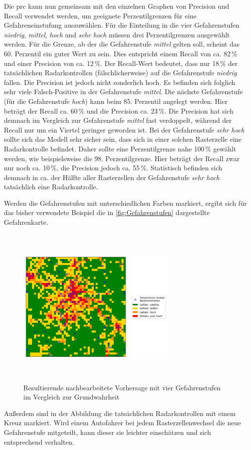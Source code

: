 Die \acrshort{prc} kann nun gemeinsam mit den einzelnen Graphen von Precision und Recall verwendet werden, um geeignete Perzentilgrenzen für eine Gefahreneinstufung auszuwählen.
Für die Einteilung in die vier Gefahrenstufen \emph{niedrig}, \emph{mittel}, \emph{hoch} und \emph{sehr hoch} müssen drei Perzentilgrenzen ausgewählt werden.
Für die Grenze, ab der die Gefahrenstufe \emph{mittel} gelten soll, scheint das 60. Perzentil ein guter Wert zu sein.
Dies entspricht einem Recall von ca. 82\,\% und einer Precision von ca. 12\,\%.
Der Recall-Wert bedeutet, dass nur 18\,\% der tatsächlichen Radarkontrollen (fälschlicherweise) auf die Gefahrenstufe \emph{niedrig} fallen.
Die Precision ist jedoch nicht sonderlich hoch.
Es befinden sich folglich sehr viele Falsch-Positive in der Gefahrenstufe \emph{mittel}.
Die nächste Gefahrenstufe (für die Gefahrenstufe \emph{hoch}) kann beim 85. Perzentil angelegt werden.
Hier beträgt der Recall ca. 60\,\% und die Precision ca. 23\,\%.
Die Precision hat sich demnach im Vergleich zur Gefahrenstufe \emph{mittel} fast verdoppelt, während der Recall nur um ein Viertel geringer geworden ist.
Bei der Gefahrenstufe \emph{sehr hoch} sollte sich das Modell sehr sicher sein, dass sich in einer solchen Rasterzelle eine Radarkontrolle befindet.
Daher sollte eine Perzentilgrenze nahe 100\,\% gewählt werden, wie beispielsweise die 98. Perzentilgrenze.
Hier beträgt der Recall zwar nur noch ca. 10\,\%, die Precision jedoch ca. 55\,\%.
Statistisch befinden sich demnach in ca. der Hälfte aller Rasterzellen der Gefahrenstufe \emph{sehr hoch} tatsächlich eine Radarkontrolle.

Werden die Gefahrenstufen mit unterschiedlichen Farben markiert, ergibt sich für das bisher verwendete Beispiel die in \autoref{fig:Gefahrenstufen} dargestellte Gefahrenkarte.

\begin{figure}[h]
    \centering
    \includegraphics[width=0.7\textwidth,height=8cm,keepaspectratio=true]{content/images/Gefahrenstufen.png}
    \caption{Resultierende nachbearbeitete Vorhersage mit vier Gefahrenstufen im Vergleich zur Grundwahrheit}
    \label{fig:Gefahrenstufen}
\end{figure}

Außerdem sind in der Abbildung die tatsächlichen Radarkontrollen mit einem Kreuz markiert.
Wird einem Autofahrer bei jedem Rasterzellenwechsel die neue Gefahrenstufe mitgeteilt, kann dieser sie leichter einschätzen und sich entsprechend verhalten.
